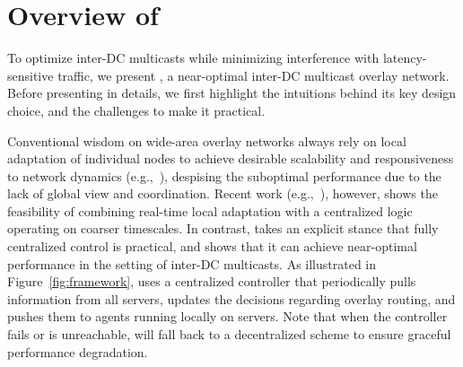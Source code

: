 \section{Overview of \name}
\label{sec:overview}

To optimize inter-DC multicasts while minimizing
interference with latency-sensitive traffic, we present {\em \name},
a near-optimal inter-DC multicast overlay network.
Before presenting \name in details,
we first highlight the intuitions behind its
key design choice, and the challenges to make it practical.







Conventional wisdom on wide-area overlay networks
always rely on local adaptation of individual
nodes to achieve desirable scalability
and responsiveness to network dynamics (e.g.,~\cite{Andreev2013Designing,Repantis2010Scaling,Huang2014A}),
despising the suboptimal performance due to
the lack of global view and coordination.
Recent work (e.g.,~\cite{mukerjee2014enabling}), however,
shows the feasibility of combining real-time
local adaptation with a centralized logic operating
on coarser timescales.
In contrast, \name takes an explicit stance that
fully centralized control is practical,
and shows that it can achieve near-optimal performance in
the setting of inter-DC multicasts.
As illustrated in Figure~\ref{fig:framework},
\name uses a centralized controller that periodically pulls
information from all servers, updates the decisions regarding overlay
routing, and pushes them to agents running locally on servers.
Note that when the controller fails or is unreachable,
\name will fall back to a decentralized scheme
to ensure graceful performance degradation.

